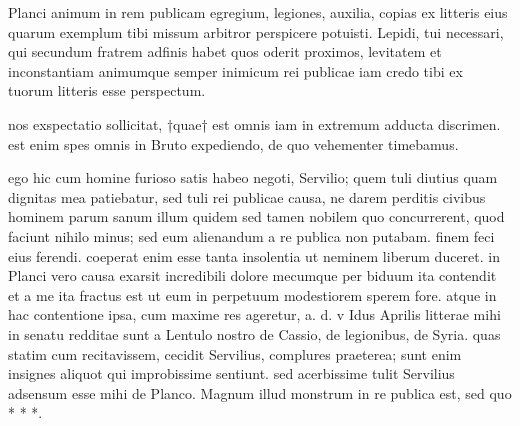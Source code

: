 


 Planci animum in rem publicam egregium, legiones, auxilia, copias ex litteris eius quarum exemplum tibi missum arbitror perspicere potuisti. Lepidi, tui necessari, qui secundum fratrem adfinis habet quos oderit proximos, levitatem et inconstantiam animumque semper inimicum rei publicae iam credo tibi ex tuorum litteris esse perspectum.

 nos exspectatio sollicitat, †quae† est omnis iam in extremum adducta discrimen. est enim spes omnis in Bruto expediendo, de quo vehementer timebamus.

 ego hic cum homine furioso satis habeo negoti, Servilio; quem tuli diutius quam dignitas mea patiebatur, sed tuli rei publicae causa, ne darem perditis civibus hominem parum sanum illum quidem sed tamen nobilem quo concurrerent, quod faciunt nihilo minus; sed eum alienandum a re publica non putabam. finem feci eius ferendi. coeperat enim esse tanta insolentia ut neminem liberum duceret. in Planci vero causa exarsit incredibili dolore mecumque per biduum ita contendit et a me ita fractus est ut eum in perpetuum modestiorem sperem fore. atque in hac contentione ipsa, cum maxime res ageretur, a. d. v Idus Aprilis litterae mihi in senatu redditae sunt a Lentulo nostro de Cassio, de legionibus, de Syria. quas statim cum recitavissem, cecidit Servilius, complures praeterea; sunt enim insignes aliquot qui improbissime sentiunt. sed acerbissime tulit Servilius adsensum esse mihi de Planco. Magnum illud monstrum in re publica est, sed quo * * *.
